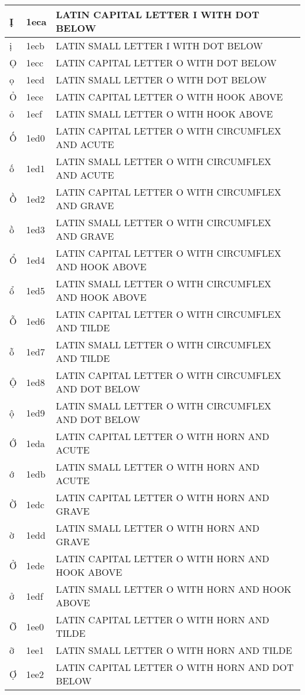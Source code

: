 \documentclass[12pt,letterpaper,openany]{book}
\begin{document}
\begin{center}
\begin{supertabular}{|m{0.25in}|m{0.5in}|m{4in}|}
			Ị & 1eca & LATIN CAPITAL LETTER I WITH DOT BELOW\\\hline
			ị & 1ecb & LATIN SMALL LETTER I WITH DOT BELOW\\\hline
			Ọ & 1ecc & LATIN CAPITAL LETTER O WITH DOT BELOW\\\hline
			ọ & 1ecd & LATIN SMALL LETTER O WITH DOT BELOW\\\hline
			Ỏ & 1ece & LATIN CAPITAL LETTER O WITH HOOK ABOVE\\\hline
			ỏ & 1ecf & LATIN SMALL LETTER O WITH HOOK ABOVE\\\hline
			Ố & 1ed0 & LATIN CAPITAL LETTER O WITH CIRCUMFLEX AND ACUTE\\\hline
			ố & 1ed1 & LATIN SMALL LETTER O WITH CIRCUMFLEX AND ACUTE\\\hline
			Ồ & 1ed2 & LATIN CAPITAL LETTER O WITH CIRCUMFLEX AND GRAVE\\\hline
			ồ & 1ed3 & LATIN SMALL LETTER O WITH CIRCUMFLEX AND GRAVE\\\hline
			Ổ & 1ed4 & LATIN CAPITAL LETTER O WITH CIRCUMFLEX AND HOOK ABOVE\\\hline
			ổ & 1ed5 & LATIN SMALL LETTER O WITH CIRCUMFLEX AND HOOK ABOVE\\\hline
			Ỗ & 1ed6 & LATIN CAPITAL LETTER O WITH CIRCUMFLEX AND TILDE\\\hline
			ỗ & 1ed7 & LATIN SMALL LETTER O WITH CIRCUMFLEX AND TILDE\\\hline
			Ộ & 1ed8 & LATIN CAPITAL LETTER O WITH CIRCUMFLEX AND DOT BELOW\\\hline
			ộ & 1ed9 & LATIN SMALL LETTER O WITH CIRCUMFLEX AND DOT BELOW\\\hline
			Ớ & 1eda & LATIN CAPITAL LETTER O WITH HORN AND ACUTE\\\hline
			ớ & 1edb & LATIN SMALL LETTER O WITH HORN AND ACUTE\\\hline
			Ờ & 1edc & LATIN CAPITAL LETTER O WITH HORN AND GRAVE\\\hline
			ờ & 1edd & LATIN SMALL LETTER O WITH HORN AND GRAVE\\\hline
			Ở & 1ede & LATIN CAPITAL LETTER O WITH HORN AND HOOK ABOVE\\\hline
			ở & 1edf & LATIN SMALL LETTER O WITH HORN AND HOOK ABOVE\\\hline
			Ỡ & 1ee0 & LATIN CAPITAL LETTER O WITH HORN AND TILDE\\\hline
			ỡ & 1ee1 & LATIN SMALL LETTER O WITH HORN AND TILDE\\\hline
			Ợ & 1ee2 & LATIN CAPITAL LETTER O WITH HORN AND DOT BELOW\\\hline

\end{supertabular}
\end{center}
\end{document}
